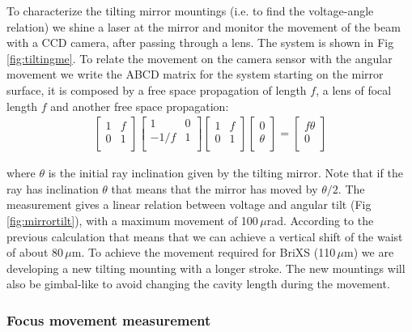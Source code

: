 To characterize the tilting mirror mountings (i.e. to find the voltage-angle relation) we shine a laser at the mirror and monitor the movement of the beam with a CCD camera, after passing through a lens. The system is shown in Fig \ref{fig:tiltingme}. To relate the movement on the camera sensor with the angular movement we write the ABCD matrix for the system starting on the mirror surface, it is composed by a free space propagation of length $f$, a lens of focal length $f$ and another free space propagation:
\begin{align}
\begin{bmatrix}
1 & f \\
0 & 1 \\
\end{bmatrix}
\begin{bmatrix}
1 & 0 \\
-1/f & 1 \\
\end{bmatrix}
	\begin{bmatrix}
	1 & f \\
	0 & 1 \\
	\end{bmatrix}
	\begin{bmatrix}
	0 \\
	\theta  \\
	\end{bmatrix}
	=
	\begin{bmatrix}
	f\theta \\
	0  \\
	\end{bmatrix}
\end{align}

where $\theta$ is the initial ray inclination given by the tilting mirror. Note that if the ray has inclination $\theta$ that means that the mirror has moved by $\theta/2$.
The measurement gives a linear relation between voltage and angular tilt (Fig \ref{fig:mirrortilt}), with a maximum movement of 100\,$\mu$rad. According to the previous calculation that means that we can achieve a vertical shift of the waist of about 80\,$\mu$m. To achieve the movement required for BriXS (110\,$\mu$m) we are developing a new tilting mounting with a longer stroke. The new mountings will also be gimbal-like to avoid changing the cavity length during the movement.


\subsubsection{Focus movement measurement}

